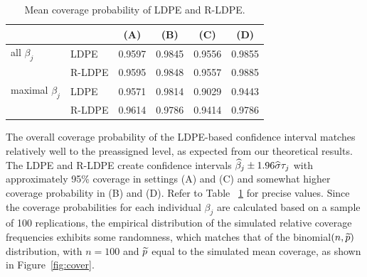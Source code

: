 \documentclass[11pt]{amsart}
\begin{document}
\begin{table}[ht]
\begin{tabular}{llcccc}
\toprule
&&(A)&(B)&(C)&(D)\\
\midrule
all $\beta_j$& LDPE & 0.9597 & 0.9845 & 0.9556 & 0.9855 \\
 &R-LDPE & 0.9595 & 0.9848 & 0.9557 & 0.9885  \\
 maximal $\beta_j$ & LDPE&  0.9571 & 0.9814& 0.9029 &0.9443\\
& R-LDPE & 0.9614 & 0.9786 & 0.9414 & 0.9786\\
\bottomrule
\end{tabular}
\caption{Mean coverage probability of LDPE and R-LDPE.}
\label{table:meancover}
\end{table}

The overall coverage probability of the LDPE-based confidence interval matches relatively 
well to the preassigned level, as expected from our theoretical results. 
The LDPE and R-LDPE create confidence intervals $\widehat{\beta}_j\pm 1.96\widehat{\sigma} \tau_j$ with 
approximately 95\% coverage in settings (A) and ({C}) and somewhat higher coverage probability in (B) and (D). 
Refer to Table ~\ref{table:meancover} for precise values. 
Since the coverage probabilities for each individual $\beta_j$ are calculated based on a sample of 
100 replications, the empirical distribution of the simulated relative coverage frequencies 
exhibits some randomness, which matches that of the 
binomial$(n,\widetilde{p})$ distribution, with $n = 100$ and $\widetilde{p}$
equal to the simulated mean coverage, as shown in Figure~\ref{fig:cover}. 
\end{document}

